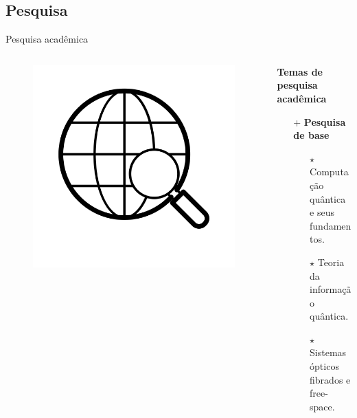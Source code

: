\documentclass{beamer}
\begin{document}
\subsection{Pesquisa}
%
\begin{frame}{Pesquisa acadêmica}
    \begin{columns}[T] %
        \begin{column}{.1\textwidth}
            \vspace{1cm}
            \begin{figure}[b!]
                \centering
                \includegraphics[scale=0.20]{pesq.png}
            \end{figure}
        \end{column}%
        \hfill%
        \begin{column}{.75\textwidth}
            \textbf{Temas de pesquisa acadêmica}
            \begin{itemize}
                \item [+] \textbf{Pesquisa de base} 
                \begin{itemize}
                    \item [$\star$] Computação quântica e seus fundamentos.
                    \item [$\star$] Teoria da informação quântica.
                    \item [$\star$] Sistemas ópticos fibrados e free-space.

\end{itemize}
\end{itemize}
\end{column}
\end{columns}
\end{frame}
\end{document}
